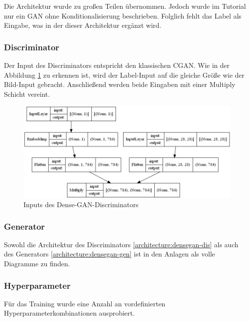 Die Architektur wurde zu großen Teilen übernommen.
Jedoch wurde im Tutorial nur ein GAN ohne Konditionalisierung beschrieben.
Folglich fehlt das Label als Eingabe, was in der dieser Architektur ergänzt wird.
\newline

\subsubsection{Discriminator}
Der Input des Discriminators entspricht den klassischen CGAN.
Wie in der Abbildung \ref{architecture:densegan-dis-input} zu erkennen ist, wird der Label-Input auf die gleiche Größe wie der Bild-Input gebracht.
Anschließend werden beide Eingaben mit einer Multiply Schicht vereint.

\begin{figure}[H]
	\centering
	\includegraphics[height=0.3\textheight]{kapitel/5_ergebnisse/architectures/densegan_discriminator/inputs.png}
	\caption{Inputs des Dense-GAN-Discriminators}
	\label{architecture:densegan-dis-input}
\end{figure}

\subsubsection{Generator}

Sowohl die Architektur des Discriminators \cref{architecture:densegan-dis} als auch des Generators \cref{architecture:densegan-gen} ist in den Anlagen als volle Diagramme zu finden.

\subsubsection{Hyperparameter}
Für das Training wurde eine Anzahl an vordefinierten Hyperparameterkombinationen ausprobiert.

